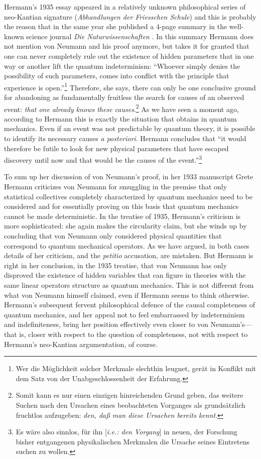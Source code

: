 \documentclass[11pt]{article}
\begin{document}
Hermann's 1935 essay appeared in a relatively unknown philosophical series of neo-Kantian signature (\emph{Abhandlungen der Friesschen Schule}) and this is probably the reason that in the same year she published a 4-page summary in the well-known science journal \emph{Die Naturwissenschaften} \cite{hermann2}. In this summary Hermann does not mention von Neumann and his proof anymore, but takes it for granted that one can never completely rule out the existence of hidden parameters that in one way or another lift the quantum indeterminism: ``Whoever simply denies the possibility of such parameters, comes into conflict with the principle that experience is open.''\footnote{Wer die M\"{o}glichkeit solcher Merkmale slechthin leugnet, ger\"{a}t in Konflikt mit dem Satz von der Unabgeschlossenheit der Erfahrung.} Therefore, she says, there can only be one conclusive ground for abandoning as fundamentally fruitless the search for causes of an observed event: \emph{that one already knows these causes}.\footnote{Somit kann es nur einen einzigen hinreichenden Grund geben, das weitere Suchen nach den Ursachen eines beobachteten Vorganges als grunds\"{a}tzlich fruchtlos aufzugeben: \emph{den, da{\ss} man diese Ursachen bereits kennt}.} As we have seen a moment ago, according to Hermann this is exactly the situation that obtains in quantum mechanics. Even if an event was not predictable by quantum theory, it is possible to identify its necessary causes \emph{a posteriori}. Hermann concludes that ``it would therefore be futile to look for new physical parameters that have escaped discovery until now and that would be the causes of the event.''\footnote{Es w\"{a}re also sinnlos, f\"{u}r ihn [\emph{i.e.: den Vorgang}] in neuen, der Forschung bisher entgangenen physikalischen Merkmalen die Ursache seines Eintretens suchen zu wollen.}

To sum up her discussion of von Neumann's proof, in her 1933 manuscript Grete Hermann criticizes von Neumann for smuggling in the premise that only statistical collectives completely characterized by quantum mechanics need to be considered and for essentially proving on this basis that quantum mechanics cannot be made deterministic. In the treatise of 1935, Hermann's criticism is more sophisticated: she again makes the circularity claim, but she winds up by concluding that von Neumann only considered physical quantities that correspond to  quantum mechanical operators. As we have argued, in both cases details of her criticism, and the \emph{petitio} accusation, are mistaken. But Hermann is right in her conclusion, in the 1935 treatise, that von Neumann has only disproved the existence of hidden variables that can figure in theories with the same linear operators structure as quantum mechanics. This is not different from what von Neumann himself claimed, even if Hermann seems to think otherwise. Hermann's subsequent fervent philosophical defence of the causal completeness of quantum mechanics, and her appeal not to feel embarrassed by indeterminism and indefiniteness, bring her position effectively even closer to von Neumann's---that is, closer with respect to the question of completeness, not with respect to Hermann's neo-Kantian argumentation, of course.
\end{document}
